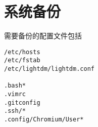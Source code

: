 \section{系统备份}
需要备份的配置文件包括


\begin{verbatim}
/etc/hosts
/etc/fstab
/etc/lightdm/lightdm.conf

.bash*
.vimrc
.gitconfig
.ssh/*
.config/Chromium/User*
\end{verbatim}


